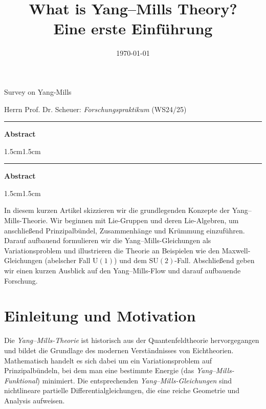 \documentclass[10pt, letterpaper]{article}
\renewenvironment{abstract}
  {
    \begin{center}
      \normalfont\bfseries Abstract
    \end{center}
    \begin{adjustwidth}{1.5cm}{1.5cm}
    \small
  }
  {
    \end{adjustwidth}
  }
\begin{document}
\begin{center}
    \Large{Survey on Yang-Mills}\\[10pt]
\end{center}
\begin{center}
    {Herrn Prof. Dr. Scheuer: \textit{Forschungspraktikum} (WS24/25)}
\end{center}

\rule{\textwidth}{0.5pt}
\begin{abstract}
\end{abstract}
\rule{\textwidth}{0.5pt}
\vspace{0.5cm}

\tableofcontents



\pagebreak

\title{\textbf{What is Yang--Mills Theory? \\ \large Eine erste Einführung}}
\author{}
\date{\today}
\maketitle


\begin{abstract}
In diesem kurzen Artikel skizzieren wir die grundlegenden Konzepte der Yang--Mills-Theorie. Wir beginnen mit Lie-Gruppen und deren Lie-Algebren, um anschließend Prinzipalbündel, Zusammenhänge und Krümmung einzuführen. Darauf aufbauend formulieren wir die Yang--Mills-Gleichungen als Variationsproblem und illustrieren die Theorie an Beispielen wie den Maxwell-Gleichungen (abelscher Fall \(\mathrm{U}(1)\)) und dem \(\mathrm{SU}(2)\)-Fall. Abschließend geben wir einen kurzen Ausblick auf den Yang--Mills-Flow und darauf aufbauende Forschung.
\end{abstract}



\section{Einleitung und Motivation}
Die \emph{Yang--Mills-Theorie} ist historisch aus der Quantenfeldtheorie hervorgegangen und bildet die Grundlage des modernen Verständnisses von Eichtheorien. Mathematisch handelt es sich dabei um ein Variationsproblem auf Prinzipalbündeln, bei dem man eine bestimmte Energie (das \emph{Yang--Mills-Funktional}) minimiert. Die entsprechenden \emph{Yang--Mills-Gleichungen} sind nichtlineare partielle Differentialgleichungen, die eine reiche Geometrie und Analysis aufweisen.
\end{document}
